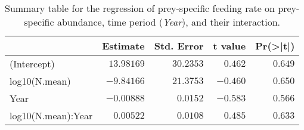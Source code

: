 \begin{table}[!htbp]
\caption{Summary table for the regression of 
  prey-specific feeding rate 
  on prey-specific abundance,
  time period (\emph{Year}), 
  and their interaction.\label{tab:FNYint}} 
\begin{center}
\begin{tabular}{lrrrr}
\hline
\multicolumn{1}{l}{}&\multicolumn{1}{c}{Estimate}&\multicolumn{1}{c}{Std. Error}&\multicolumn{1}{c}{t value}&\multicolumn{1}{c}{Pr(\textgreater |t|)}\tabularnewline
\hline
(Intercept)&$13.98169$&$30.2353$&$ 0.462$&$0.649$\tabularnewline
log10(N.mean)&$-9.84166$&$21.3753$&$-0.460$&$0.650$\tabularnewline
Year&$-0.00888$&$ 0.0152$&$-0.583$&$0.566$\tabularnewline
log10(N.mean):Year&$ 0.00522$&$ 0.0108$&$ 0.485$&$0.633$\tabularnewline
\hline
\end{tabular}\end{center}
\end{table}
